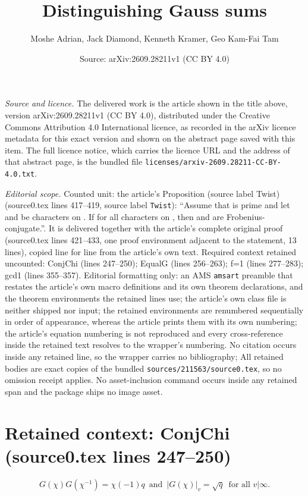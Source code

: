 \documentclass[10pt,a4paper]{amsart}
\title[Distinguishing Gauss sums]{Distinguishing Gauss sums}
\author{Moshe Adrian, Jack Diamond, Kenneth Kramer, Geo Kam-Fai Tam}
\date{Source: arXiv:2609.28211v1 (CC BY 4.0)}
\theoremstyle{definition}
\theoremstyle{plain}
\theoremstyle{definition}
\begin{document}
\maketitle

\noindent\emph{Source and licence.} The delivered work is the article shown in the title above, version arXiv:2609.28211v1 (CC BY 4.0), distributed under the Creative Commons Attribution 4.0 International licence, as recorded in the arXiv licence metadata for this exact version and shown on the abstract page saved with this item. The full licence notice, which carries the licence URL and the address of that abstract page, is the bundled file \texttt{licenses/arxiv-2609.28211-CC-BY-4.0.txt}.
\par\smallskip

\noindent\textit{Editorial scope.} Counted unit: the article's Proposition (source label Twist) (source0.tex lines 417--419, source label \texttt{Twist}): ``Assume that is prime and let and be characters on . If for all characters on , then and are Frobenius-conjugate.''. It is delivered together with the article's complete original proof (source0.tex lines 421--433, one proof environment adjacent to the statement, 13 lines), copied line for line from the article's own text. Required context retained uncounted: ConjChi (lines 247--250); EqualG (lines 256--263); f=1 (lines 277--283); gcd1 (lines 355--357). Editorial formatting only: an AMS \texttt{amsart} preamble that restates the article's own macro definitions and its own theorem declarations, and the theorem environments the retained lines use; the article's own class file is neither shipped nor input; the retained environments are renumbered sequentially in order of appearance, whereas the article prints them with its own numbering; the article's equation numbering is not reproduced and every cross-reference inside the retained text resolves to the wrapper's numbering. No citation occurs inside any retained line, so the wrapper carries no bibliography; All retained bodies are exact copies of the bundled \texttt{sources/211563/source0.tex}, so no omission receipt applies. No asset-inclusion command occurs inside any retained span and the package ships no image asset.


\section*{Retained context: ConjChi (source0.tex lines 247--250)}

\begin{equation}  \label{ConjChi}
G(\chi) G(\chi^{-1}) = \chi(-1) q
\, \text{ and } \,  \vert G(\chi) \vert_v = \sqrt{q} \,  \text{ for all } v \vert \infty.
\end{equation}
\end{document}
